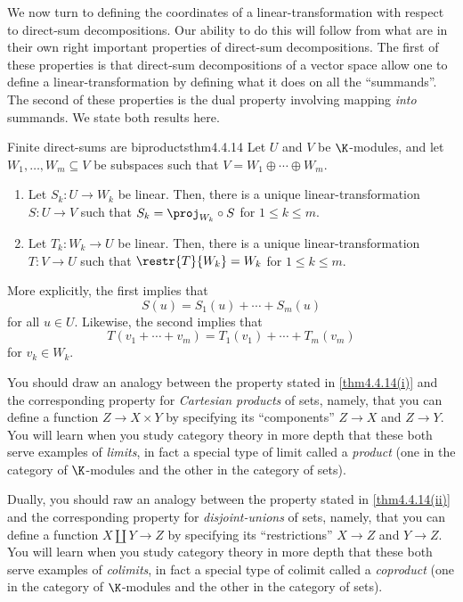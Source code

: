 We now turn to defining the coordinates of a linear-transformation with respect to direct-sum decompositions.  Our ability to do this will follow from what are in their own right important properties of direct-sum decompositions.  The first of these properties is that direct-sum decompositions of a vector space allow one to define a linear-transformation by defining what it does on all the ``summands''.  The second of these properties is the dual property involving mapping \emph{into} summands.  We state both results here.
\begin{thm}{Finite direct-sums are biproducts}{thm4.4.14}
	Let $U$ and $V$ be $\K$-modules, and let $W_1,\ldots ,W_m\subseteq V$ be subspaces such that $V=W_1\oplus \cdots \oplus W_m$.
	\begin{enumerate}
		\item \label{thm4.4.14(i)}Let $S_k\colon U\rightarrow W_k$ be linear.  Then, there is a unique linear-transformation $S\colon U\rightarrow V$ such that $S_k=\proj _{W_k}\circ S$ for $1\leq k\leq m$.
		\item \label{thm4.4.14(ii)}Let $T_k\colon W_k\rightarrow U$ be linear.  Then, there is a unique linear-transformation $T\colon V\rightarrow U$ such that $\restr{T}{W_k}=W_k$ for $1\leq k\leq m$.
	\end{enumerate}
	\begin{rmk}
		More explicitly, the first implies that
		\begin{equation}
			S(u)=S_1(u)+\cdots +S_m(u)
		\end{equation}
		for all $u\in U$.  Likewise, the second implies that
		\begin{equation}
			T(v_1+\cdots +v_m)=T_1(v_1)+\cdots +T_m(v_m)
		\end{equation}
		for $v_k\in W_k$.
	\end{rmk}
	\begin{rmk}
		You should draw an analogy between the property stated in \cref{thm4.4.14(i)} and the corresponding property for \emph{Cartesian products} of sets, namely, that you can define a function $Z\rightarrow X\times Y$ by specifying its ``components'' $Z\rightarrow X$ and $Z\rightarrow Y$.  You will learn when you study category theory in more depth that these both serve examples of \emph{limits}, in fact a special type of limit called a \emph{product} (one in the category of $\K$-modules and the other in the category of sets).
	\end{rmk}
	\begin{rmk}
		Dually, you should raw an analogy between the property stated in \cref{thm4.4.14(ii)} and the corresponding property for \emph{disjoint-unions} of sets, namely, that you can define a function $X\coprod Y\rightarrow Z$ by specifying its ``restrictions'' $X\rightarrow Z$ and $Y\rightarrow Z$.  You will learn when you study category theory in more depth that these both serve examples of \emph{colimits}, in fact a special type of colimit called a \emph{coproduct} (one in the category of $\K$-modules and the other in the category of sets).

\end{rmk}
\end{thm}
